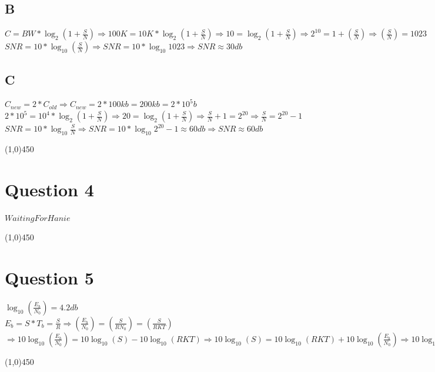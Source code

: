 \documentclass[a4paper,12pt]{book}
\begin{document}
\subsection{B}
\begin{doublespace}
$C = BW * \log_2 {(1 + \frac{S}{N} )}  \Longrightarrow 100K = 10K * \log_2 {(1 + \frac{S}{N}) }  \Longrightarrow 10 = \log_2 {(1 + \frac{S}{N}) } \Longrightarrow 2^{10} = 1 + (\frac{S}{N}) \Longrightarrow (\frac{S}{N}) = 1023 $\\
$SNR = 10 * \log_{10} (\frac {S}{N}) \Longrightarrow SNR = 10 * \log_{10}{1023} \Longrightarrow SNR \approx 30 db$
\end{doublespace}


\subsection{C}
\begin{doublespace}
$C_{new} = 2 * C_{old} \Longrightarrow C_{new} = 2 * 100kb = 200kb = 2 * 10^5 b$\\
$2 * 10^5 = 10^4 * \log_2 {(1 + \frac{S}{N} ) } \Longrightarrow 20 = \log_2 {(1 + \frac{S}{N} )} \Longrightarrow \frac{S}{N} + 1 = 2 ^{20} \Longrightarrow \frac{S}{N} = 2^{20} - 1 $\\
$SNR = 10 * \log_{10}{\frac{S}{N}} \Longrightarrow SNR = 10 * \log_{10}{2^{20} - 1 } \approx 60 db  \Longrightarrow SNR \approx 60 db$

\end{doublespace}
\line(1,0){450}

\section {Question 4 }
\begin{doublespace}
$Waiting For Hanie$
\end{doublespace}
\line(1,0){450}

\section {Question 5 }
\begin{doublespace}
$\log_{10}{(\frac{E_b}{N_0})} = 4.2 db$\\
$E_b = S * T_b = \frac{S}{R} \Longrightarrow (\frac{E_b}{N_0}) = (\frac{S}{R N_0}) =( \frac{S}{RKT})$\\
$\Longrightarrow 10 \log_{10}{(\frac{E_b}{N_0})} = 10 \log_{10}{(S)} - 10 \log_{10}{(RKT)} \Longrightarrow 10 \log_{10}{(S)} = 10 \log_{10}{(RKT)} + 10 \log_{10}{(\frac{E_b}{N_0})} \Longrightarrow 10 \log_{10}{(S)} = 10 \log_{10}{(RKT)} + 4.2 \Longrightarrow 10 \log_{10}{(S)} = 10 \log_{10}{(270 * 3600 * 1.38 * 10^{-23})} + 4.2  \Longrightarrow  10 \log_{10}{(S)} = -164.67 \Longrightarrow  \log_{10}{(S)} = -16.467 \Longrightarrow S = 10^{-16.46} \approx 10^{-16}$
\end{doublespace}
\line(1,0){450}
\end{document}
